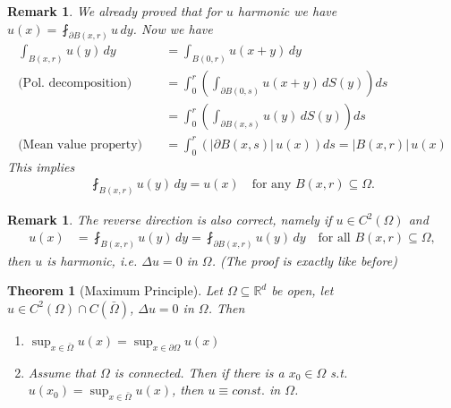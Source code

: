 \documentclass{report}
\theoremstyle{tommy}
\newtheorem{thm}[defn]{Theorem}
\newtheorem{rem}[defn]{Remark}
\begin{document}
\begin{rem}
  We already proved that for \(u\) harmonic we have \( u(x) = \fint_{\partial B(x,r)} u \, dy \). Now we have 
  \begin{align*}
    \int_{B(x, r)} u(y) \, dy 
    &= \int_{B(0, r)} u(x+y) \, dy \\
    \text{(Pol.\ decomposition)} \quad &= \int_0^r \left(\int_{\partial B(0, s)} u(x+y) \, dS(y)\right) ds \\
    &= \int_0^r \left(\int_{\partial B(x, s)} u(y) \, dS(y) \right) ds \\
    \text{(Mean value property)} \quad &= \int_0^r \left(|\partial B(x, s)| \, u(x) \right) ds
    = |B(x,r)| \, u(x)
  \end{align*}
  This implies
  \begin{align*}
    \fint_{B(x,r)} u(y) \, dy = u(x)
    \quad \text{for any \(B(x,r) \subseteq \Omega\).}
  \end{align*}
\end{rem}

\begin{rem}
  The reverse direction is also correct, namely if \(u \in C^2(\Omega)\) and
  \begin{align*}
    u(x) 
    &= \fint_{B(x, r)} u(y) \, dy
    = \fint_{\partial B(x,r)} u(y) \, dy
    \quad \text{for all } B(x,r) \subseteq \Omega,
  \end{align*}
  then \(u\) is harmonic, i.e. \(\Delta u = 0\) in \(\Omega\). (The proof is exactly like before)
\end{rem}

\begin{thm}[Maximum Principle]\label{maximum-principle}
  Let \(\Omega \subseteq \mathbb{R}^d\) be open, let \(u \in C^2(\Omega) \cap C(\bar \Omega)\), \(\Delta u = 0\) in \(\Omega\). Then
  \begin{enumerate}[label=\alph*)]
    \item \(\sup_{x \in \bar \Omega} u(x) = \sup_{x \in \partial \Omega} u(x)\)
    \item Assume that \(\Omega\) is connected. Then if there is a \(x_0 \in \Omega\) s.t. \( u(x_0) = \sup_{x \in \bar \Omega} u(x)\), then \( u \equiv const.\) in \(\Omega\).
  \end{enumerate}
\end{thm}
\end{document}
